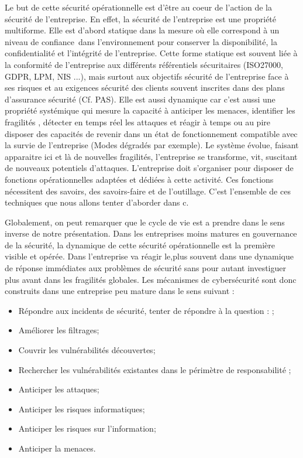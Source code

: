 Le but de cette sécurité opérationnelle est d’être au coeur de l’action de la sécurité de l’entreprise. En effet, la sécurité de l’entreprise est une propriété multiforme. Elle est d’abord statique dans la mesure où elle correspond à un niveau de confiance dans l’environnement pour conserver la disponibilité, la confidentialité et l’intégrité de l’entreprise. Cette forme statique est souvent liée à la conformité de l’entreprise aux différents référentiels sécuritaires (ISO27000, GDPR, LPM, NIS ...), mais surtout aux objectifs sécurité de l'entreprise face à ses risques et au exigences sécurité des clients souvent inscrites dans des plans d’assurance sécurité (Cf. PAS). 
Elle est aussi dynamique car c’est aussi une propriété systémique qui mesure la capacité à anticiper les menaces, identifier les fragilités , détecter en temps réel les attaques et réagir à temps ou au pire disposer des capacités de revenir dans un état de fonctionnement compatible avec la survie de l’entreprise (Modes dégradés par exemple).
Le système évolue, faisant apparaitre ici et là de nouvelles fragilités, l’entreprise se transforme, vit, suscitant de nouveaux potentiels d’attaques. L’entreprise doit s’organiser pour disposer de fonctions opérationnelles adaptées et dédiées à cette activité. Ces fonctions nécessitent des savoirs, des savoirs-faire et de l’outillage. C’est l’ensemble de ces techniques que nous allons tenter d’aborder dans c\edoc.

Globalement, on peut remarquer que le cycle de vie est a prendre dans le sens inverse de notre présentation. Dans les entreprises moins matures en gouvernance de la sécurité, la dynamique de cette sécurité opérationnelle est la première visible et opérée. Dans l'entreprise va réagir le,plus souvent dans une dynamique de réponse immédiates aux problèmes de sécurité sans pour autant investiguer plus avant dans les fragilités globales. Les mécanismes de cybersécurité sont donc construits dans une entreprise peu mature dans le sens suivant :

	\begin{itemize}
		\item Répondre aux incidents de sécurité, tenter de répondre à la question : ; 
		\item Améliorer les filtrages;
		\item Couvrir les vulnérabilités découvertes;
		\item Rechercher les vulnérabilités existantes dans le périmètre de responsabilité ;
		\item Anticiper les attaques;
		\item Anticiper les risques informatiques;
		\item Anticiper les risques sur l'information;
		\item Anticiper la menaces.
	\end{itemize}


